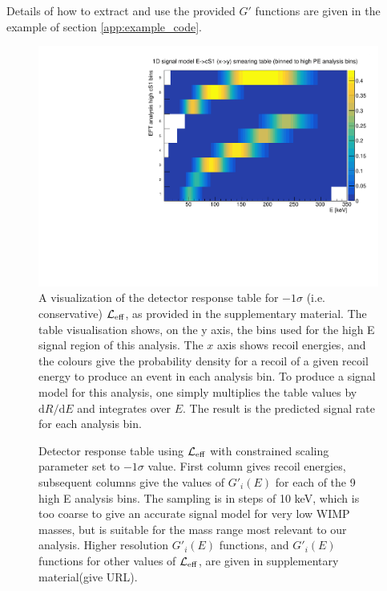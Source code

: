 Details of how to extract and use the provided $G'$ functions are given in the example of section \ref{app:example_code}. 

\begin{figure}
\centerline{\includegraphics[width=1.\linewidth]{Figures/smeartable_highE}}
\caption{A visualization of the detector response table for $-1\sigma$ (i.e. conservative) $\mathcal{L}_{\mathrm{eff}}$, as provided in the supplementary material. The table visualisation shows, on the y axis, the bins used for the high E signal region of this analysis. The $x$ axis shows recoil energies, and the colours give the probability density for a recoil of a given recoil energy to produce an event in each analysis bin. To produce a signal model for this analysis, one simply multiplies the table values by $\mathrm{d}R/\mathrm{d}E$ and integrates over $E$. The result is the predicted signal rate for each analysis bin.}
\label{fig:smeartable_highE}
\end{figure}  

\begin{figure}
{

  \lstset{tabsize=4,basicstyle=\tiny\ttfamily,columns=flexible,emptylines=10000}
  
}
\caption{Detector response table using $\mathcal{L}_{\mathrm{eff}}$ with constrained scaling parameter set to $-1\sigma$ value. First column gives recoil energies, subsequent columns give the values of $G'_i(E)$ for each of the 9 high E analysis bins. The sampling is in steps of 10 keV, which is too coarse to give an accurate signal model for very low WIMP masses, but is suitable for the mass range most relevant to our analysis. Higher resolution $G'_i(E)$ functions, and $G'_i(E)$ functions for other values of $\mathcal{L}_{\mathrm{eff}}$, are given in supplementary material\BenComment(give URL). 
\label{tab:smeartable_highE}
}
\end{figure}  

